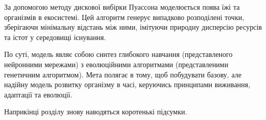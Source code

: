 За допомогою методу дискової вибірки Пуассона
\cite{bridsonFastPoissonDisk2007}
моделюється поява їжі та організмів в екосистемі. 
Цей алгоритм генерує випадково розподілені точки, 
зберігаючи мінімальну відстань між ними, 
імітуючи природну дисперсію ресурсів та 
істот у середовищі існування.

По суті, модель являє собою синтез глибокого навчання 
(представленого нейронними мережами) 
з еволюційними алгоритмами (представленими генетичним алгоритмом). 
Мета полягає в тому, щоб побудувати базову, 
але надійну модель розвитку організму в часі, 
керуючись принципами виживання, адаптації та еволюції.






\chapconclude{\ref{chap:theory}}

Наприкінці розділу знову наводяться коротенькі підсумки.
